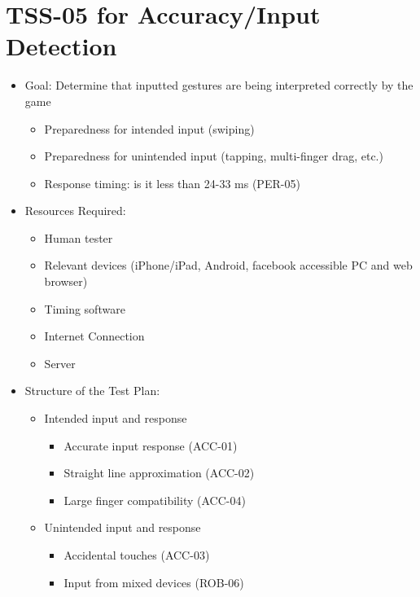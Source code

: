 \section{TSS-05 for Accuracy/Input Detection}
\begin{itemize}
\item Goal: Determine that inputted gestures are being interpreted correctly by the game
\begin{itemize}
\item Preparedness for intended input (swiping)
\item Preparedness for unintended input (tapping, multi-finger drag, etc.)
\item Response timing: is it less than 24-33 ms (PER-05)
\end{itemize}

\item Resources Required:
\begin{itemize}
\item Human tester
\item Relevant devices (iPhone/iPad, Android, facebook accessible PC and web browser)
\item Timing software
\item Internet Connection 
\item Server
\end{itemize}

\item Structure of the Test Plan:
\begin{itemize}
\item Intended input and response
\begin{itemize}
\item Accurate input response (ACC-01)
\item Straight line approximation (ACC-02)
\item Large finger compatibility (ACC-04)
\end{itemize}
\item Unintended input and response
\begin{itemize}
\item Accidental touches (ACC-03)
\item Input from mixed devices (ROB-06)
\end{itemize}
\end{itemize}
\end{itemize}

